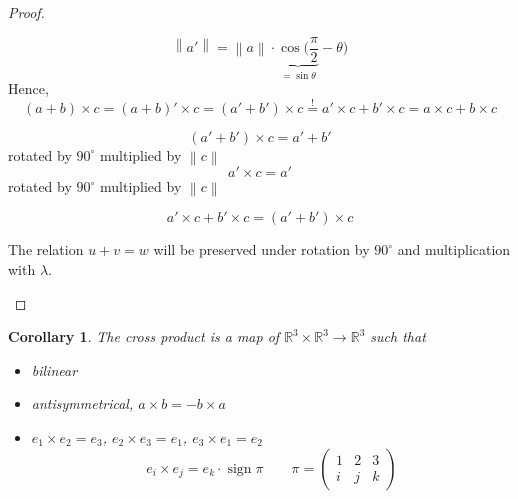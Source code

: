 \documentclass{article}
\newcounter{lecref}[section]
\numberwithin{lecref}{section}
\newtheorem{corollary}[lecref]{Corollary}
\newcommand{\norm}[1]{\left\|#1\right\|}
\DeclareMathOperator{\sign}{sign}
\begin{document}
\begin{proof}
\begin{itemize}
\begin{enumerate}
          \[ \norm{a'} = \norm{a} \cdot \underbrace{\cos(\frac\pi2}_{=\sin\theta} - \theta) \]
          Hence,
          \[ (a + b) \times c = (a + b)' \times c = (a' + b') \times c \stackrel!= a' \times c + b' \times c = a \times c + b \times c \]

          \[ (a' + b') \times c = a' + b' \]
          rotated by $90^\circ$ multiplied by $\norm{c}$
          \[ a' \times c = a' \]
          rotated by $90^\circ$ multiplied by $\norm{c}$

          \[ a' \times c + b' \times c = (a' + b') \times c \]

          The relation $u + v = w$ will be preserved under rotation by $90^\circ$ and multiplication with $\lambda$.
      \end{enumerate}
  \end{itemize}
\end{proof}

\begin{corollary} %
  The cross product is a map of $\mathbb R^3 \times \mathbb R^3 \to \mathbb R^3$
  such that
  \begin{itemize}
    \item bilinear
    \item antisymmetrical, $a \times b = -b \times a$
    \item $e_1 \times e_2 = e_3$, $e_2 \times e_3 = e_1$, $e_3 \times e_1 = e_2$
      \[ e_i \times e_j = e_k \cdot \sign{\pi} \qquad \pi = \begin{pmatrix} 1 & 2 & 3 \\ i & j & k \end{pmatrix} \]
  \end{itemize}
\end{corollary}
\end{document}
